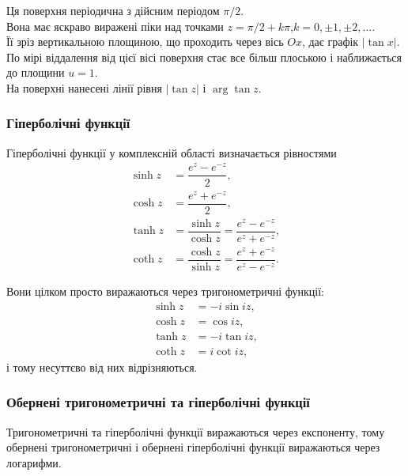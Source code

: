 Ця поверхня періодична з дійсним періодом $\pi/2$. \\

Вона має яскраво виражені піки над точками $z = \pi / 2 + k \pi$,$k = 0, \pm 1, \pm 2, \ldots$.\\

Її зріз вертикальною площиною, що проходить через вісь $Ox$, дає графік $|\tan x|$. \\

По мірі віддалення від цієї вісі поверхня стає все більш плоською і наближається до площини $u = 1$. \\

На поверхні нанесені лінії рівня $|\tan z|$ і $\arg \tan z$.\\

\subsubsection{Гіперболічні функції}

Гіперболічні функції у комплексній області визначається рівностями
\begin{align}
	\label{eq:3.4.13}
	\sinh z &= \dfrac{e^z - e^{-z}}{2}, \\
	\label{eq:3.4.14} 
	\cosh z &= \dfrac{e^z + e^{-z}}{2}, \\
	\label{eq:3.4.15}
	\tanh z &= \dfrac{\sinh z}{\cosh z} = \dfrac{e^z - e^{-z}}{e^z + e^{-z}}, \\
	\label{eq:3.4.16}
	\coth z &= \dfrac{\cosh z}{\sinh z} = \dfrac{e^z + e^{-z}}{e^z - e^{-z}}.
\end{align}

Вони цілком просто виражаються через тригонометричні функції:
\begin{align}
	\label{eq:3.4.17}
	\sinh z &= - i \sin i z, \\
	\label{eq:3.4.18}
	\cosh z &= \cos i z, \\
	\label{eq:3.4.19}
	\tanh z &= -i \tan i z, \\
	\label{eq:3.4.20}
	\coth z &= i \cot i z,
\end{align}
і тому несуттєво від них відрізняються. \\

\subsubsection{Обернені тригонометричні та гіперболічні функції}

Тригонометричні та гіперболічні функції виражаються через експоненту, тому обернені тригонометричні і обернені гіперболічні функції виражаються через логарифми. \\

